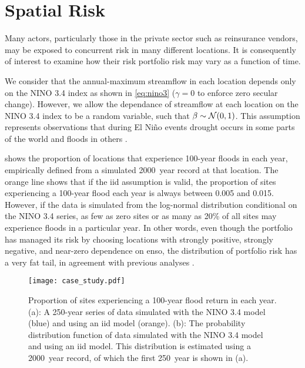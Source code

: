 \documentclass[12pt]{article}
\begin{document}
\section{Spatial Risk}

Many actors, particularly those in the private sector such as reinsurance vendors, may be exposed to concurrent risk in many different locations.
It is consequently of interest to examine how their risk portfolio risk may vary as a function of time.

We consider that the annual-maximum streamflow in each location depends only on the NINO 3.4 index as shown in \cref{eq:nino3} ($\gamma=0$ to enforce zero secular change).
However, we allow the dependance of streamflow at each location on the NINO 3.4 index to be a random variable, such that $\beta \sim \mathcal{N} \qty(0, 1)$.
This assumption represents observations that during El Ni\~no events drought occurs in some parts of the world and floods in others \citep{Ropelewski1987,Ward2014}.

 shows the proportion of locations that experience 100-year floods in each year, empirically defined from a simulated \SI{2000}{year} record at that location.
The orange line shows that if the \gls{iid} assumption is valid, the proportion of sites experiencing a 100-year flood each year is always between 0.005 and 0.015.
However, if the data is simulated from the log-normal distribution conditional on the NINO 3.4 series, as few as zero sites or as many as 20\% of all sites may experience floods in a particular year.
In other words, even though the portfolio has managed its risk by choosing locations with strongly positive, strongly negative, and near-zero dependence on \gls{enso}, the distribution of portfolio risk has a very fat tail, in agreement with previous analyses \citep{Bonnafous2017a}.
\begin{figure}
  \texttt{[image: case\_study.pdf]}
  \caption{
    Proportion of sites experiencing a 100-year flood return in each year.
    (a): A 250-year series of data simulated with the NINO 3.4 model (blue) and using an \gls{iid} model (orange). 
    (b): The probability distribution function of data simulated with the NINO 3.4 model and using an \gls{iid} model.
    This distribution is estimated using a \SI{2000}{year} record, of which the first \SI{250}{year} is shown in (a).\label{fig:spatial-risk}
  }
\end{figure}

\end{document}
